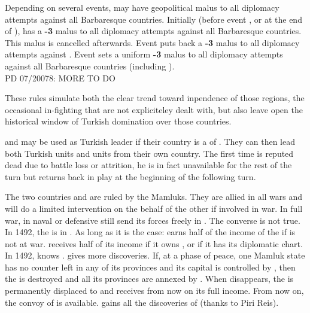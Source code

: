 Depending on several events, \TUR may have geopolitical malus to all
diplomacy attempts against all Barbaresque countries.
\bparag Initially (before event , or  at the end of
), \TUR has a {\bf -3} malus to all diplomacy attempts
against all Barbaresque countries.  This malus is cancelled afterwards.
\bparag Event  puts back a {\bf -3} malus to all
diplomacy attempts against .
\bparag Event  sets a uniform {\bf -3} malus
to all diplomacy attempts against all Barbaresque countries (including
).
\\
PD 07/20078: MORE TO DO
\begin{designnote}
These rules simulate both the clear trend toward inpendence of those regions,
the occasional in-fighting that are not expliciteley dealt with, but also leave
open the historical window of Turkish domination over those countries.
\end{designnote}

 and  may be used as Turkish leader if
their country is a \VASSAL of \TUR. They can then lead both Turkish
units and units from their own country.
 The first time  is
reputed dead due to battle loss or attrition, he is in fact unavailable
for the rest of the turn but returns back in play at the beginning of
the following turn.

\label{chSpecific:Mamluks}
\aparag The two countries  and  are ruled by
the Mamluks. They are allied in all wars and will do a limited intervention
on the behalf of the other if involved in war.
\bparag In full war,  in naval or defensive
still send its forces freely in . The converse is not true.
 In 1492, the  is in
. As long as it is the case:
\bparag \VEN earns half of the income of the  if
 is not at war.
\bparag \TUR receives half of its income if it owns , or if
it has  its diplomatic chart.
\bparag In 1492,  knows
.  gives more
discoveries.
 If, at a phase of peace, one Mamluk state
has no \ARMY counter left in any of its provinces and its capital is
controlled by \TUR, then the \MIN is destroyed and all its provinces are
annexed by \TUR.
\bparag When  disappears, the  is
permanently displaced to  and \TUR receives from now on
its full income. From now on, the convoy of  is available.
\TUR gains all the discoveries of  (thanks to Piri Reis).

